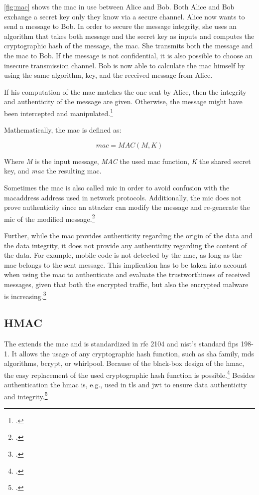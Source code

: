 \autoref{fig:mac} shows the \gls{mac} in use between Alice and Bob. Both Alice and Bob exchange a secret key only they know via a secure channel. Alice now wants to send a message to Bob. In order to secure the message integrity, she uses an algorithm that takes both message and the secret key as inputs and computes the cryptographic hash of the message, the \gls{mac}. She transmits both the message and the \gls{mac} to Bob. If the message is not confidential, it is also possible to choose an insecure transmission channel. Bob is now able to calculate the \gls{mac} himself by using the same algorithm, key, and the received message from Alice.

If his computation of the \gls{mac} matches the one sent by Alice, then the integrity and authenticity of the message are given. Otherwise, the message might have been intercepted and manipulated.\footcites[See][320]{Paar2010}

Mathematically, the \gls{mac} is defined as:

\begin{equation*}
	mac = MAC(M, K)
\end{equation*}

Where \textit{M} is the input message, \textit{MAC} the used \gls{mac} function, \textit{K} the shared secret key, and \textit{mac} the resulting \glsdesc{mac}.

Sometimes the \gls{mac} is also called \gls{mic} in order to avoid confusion with the \gls{macaddress} address used in network protocols. Additionally, the \gls{mic} does not prove authenticity since an attacker can modify the message and re-generate the \gls{mic} of the modified message.\footcites[See][60--62]{265831}

Further, while the \gls{mac} provides authenticity regarding the origin of the data and the data integrity, it does not provide any authenticity regarding the content of the data. For example, mobile code is not detected by the \gls{mac}, as long as the \gls{mac} belongs to the sent message. This implication has to be taken into account when using the \gls{mac} to authenticate and evaluate the trustworthiness of received messages, given that both the encrypted traffic, but also the encrypted malware is increasing.\footcites[See][100]{weldon2015}

\subsection{HMAC}

The  extends the \gls{mac} and is standardized in \gls{rfc} 2104 and \gls{nist}'s standard \gls{fips} 198-1. It allows the usage of any cryptographic hash function, such as \gls{sha} family, \glspl{md} algorithms, bcrypt, or whirlpool. Because of the black-box design of the \gls{hmac}, the easy replacement of the used cryptographic hash function is possible.\footcites[See][]{krawczyk1997rfc}[See][]{FIPS198} Besides authentication the \gls{hmac} is, e.g., used in \gls{tls} and \gls{jwt} to ensure data authenticity and integrity.\footcites[See][14]{rfc5246}[See][8]{rfc7519}[See][3--4]{s2011rfc}

